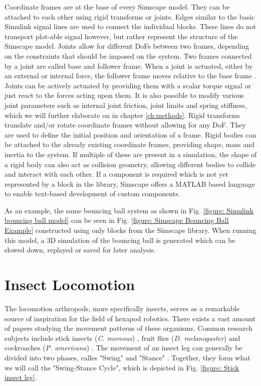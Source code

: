Coordinate frames are at the base of every Simscape model.
They can be attached to each other using rigid transforms or joints.
Edges similar to the basic Simulink signal lines are used to connect the individual blocks.
These lines do not transport plot-able signal however, but rather represent the structure of the Simscape model.
Joints allow for different DoFs between two frames, depending on the constraints that should be imposed on the system.
Two frames connected by a joint are called base and follower frame.
When a joint is actuated, either by an external or internal force, the follower frame moves relative to the base frame \parencite{thilderkvist2015motion}.
Joints can be actively actuated by providing them with a scalar torque signal or just react to the forces acting upon them.
It is also possible to modify various joint parameters such as internal joint friction, joint limits and spring stiffness, which we will further elaborate on in chapter \ref{ch:methods}.
Rigid transforms translate and/or rotate coordinate frames without allowing for any DoF.
They are used to define the initial position and orientation of a frame.
Rigid bodies can be attached to the already existing coordinate frames, providing shape, mass and inertia to the system.
If multiple of these are present in a simulation, the shape of a rigid body can also act as collision geometry, allowing different bodies to collide and interact with each other.
If a component is required which is not yet represented by a block in the library, Simscape offers a MATLAB based language to enable text-based development of custom components.

As an example, the same bouncing ball system as shown in Fig. \ref{figure: Simulink bouncing ball model} can be seen in Fig. \ref{figure: Simscape Bouncing Ball Example} constructed using only blocks from the Simscape library. When running this model, a 3D simulation of the bouncing ball is generated which can be slowed down, replayed or saved for later analysis.

\section{Insect Locomotion}
The locomotion arthropods, more specifically insects, serves as a remarkable source of inspiration for the field of hexapod robotics.
There exists a vast amount of papers studying the movement patterns of these organisms.
Common research subjects include stick insects (\textit{C. morosus}) \parencite{cruse1990mechanisms}, fruit flies (\textit{D. melanogaster}) \parencite{strauss1990coordination} and cockroaches (\textit{P. americana}) \parencite{delcomyn1971locomotion}. 
The movement of an insect leg can generally be divided into two phases, calles "Swing" and "Stance" \parencite{schilling2013walknet}.
Together, they form what we will call the "Swing-Stance Cycle", which is depicted in Fig. \ref{figure: Stick insect leg}.



